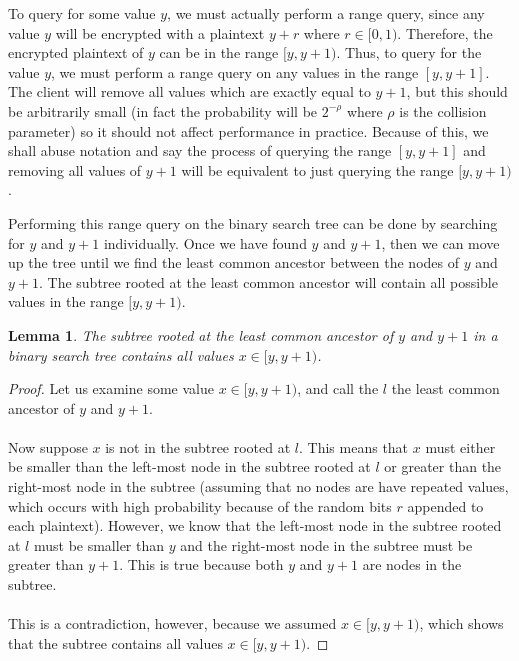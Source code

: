 \documentclass[12pt]{article}
\newtheorem{lemma}{Lemma}
\begin{document}
To query for some value $y$, we must actually perform a range query, since any value $y$ will be encrypted with a plaintext $y + r$ where $r \in [0,1)$. Therefore, the encrypted plaintext of $y$ can be in the range $[y, y + 1)$. Thus, to query for the value $y$, we must perform a range query on any values in the range $[y, y+1]$. The client will remove all values which are exactly equal to $y + 1$, but this should be arbitrarily small (in fact the probability will be $2^{-\rho}$ where $\rho$ is the collision parameter) so it should not affect performance in practice. Because of this, we shall abuse notation and say the process of querying the range $[y, y+1]$ and removing all values of $y+1$ will be equivalent to just querying the range $[y, y+1)$.

Performing this range query on the binary search tree can be done by searching for $y$ and $y+1$ individually. Once we have found $y$ and $y+1$, then we can move up the tree until we find the least common ancestor between the nodes of $y$ and $y+1$. The subtree rooted at the least common ancestor will contain all possible values in the range $[y, y+1)$. \\

  \begin{lemma}
    The subtree rooted at the least common ancestor of $y$ and $y+1$ in a binary search tree contains all values $x \in [y, y+1)$.
  \end{lemma}
  \begin{proof}
Let us examine some value $x \in [y, y+1)$, and call the $l$ the least common ancestor of $y$ and $y+1$. \\ \\
Now suppose $x$ is not in the subtree rooted at $l$. This means that $x$ must either be smaller than the left-most node in the subtree rooted at $l$ or greater than the right-most node in the subtree (assuming that no nodes are have repeated values, which occurs with high probability because of the random bits $r$ appended to each plaintext). However, we know that the left-most node in the subtree rooted at $l$ must be smaller than $y$ and the right-most node in the subtree must be greater than $y+1$. This is true because both $y$ and $y+1$ are nodes in the subtree. \\ \\
This is a contradiction, however, because we assumed $x \in [y, y+1)$, which shows that the subtree contains all values $x \in [y, y+1)$.
\end{proof}
\end{document}
